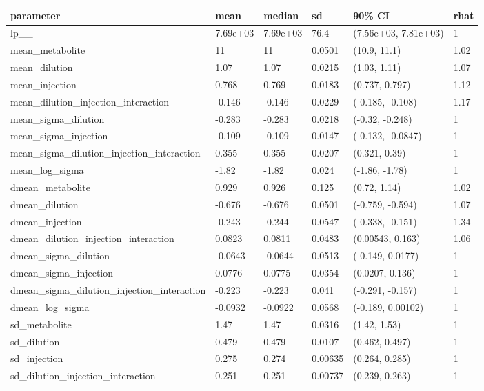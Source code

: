 
\begin{tabular}{l|l|l|l|l|l}
\hline
parameter & mean & median & sd & 90\% CI & rhat\\
\hline
lp\_\_ & 7.69e+03 & 7.69e+03 & 76.4 & (7.56e+03, 7.81e+03) & 1\\
\hline
mean\_metabolite & 11 & 11 & 0.0501 & (10.9, 11.1) & 1.02\\
\hline
mean\_dilution & 1.07 & 1.07 & 0.0215 & (1.03, 1.11) & 1.07\\
\hline
mean\_injection & 0.768 & 0.769 & 0.0183 & (0.737, 0.797) & 1.12\\
\hline
mean\_dilution\_injection\_interaction & -0.146 & -0.146 & 0.0229 & (-0.185, -0.108) & 1.17\\
\hline
mean\_sigma\_dilution & -0.283 & -0.283 & 0.0218 & (-0.32, -0.248) & 1\\
\hline
mean\_sigma\_injection & -0.109 & -0.109 & 0.0147 & (-0.132, -0.0847) & 1\\
\hline
mean\_sigma\_dilution\_injection\_interaction & 0.355 & 0.355 & 0.0207 & (0.321, 0.39) & 1\\
\hline
mean\_log\_sigma & -1.82 & -1.82 & 0.024 & (-1.86, -1.78) & 1\\
\hline
dmean\_metabolite & 0.929 & 0.926 & 0.125 & (0.72, 1.14) & 1.02\\
\hline
dmean\_dilution & -0.676 & -0.676 & 0.0501 & (-0.759, -0.594) & 1.07\\
\hline
dmean\_injection & -0.243 & -0.244 & 0.0547 & (-0.338, -0.151) & 1.34\\
\hline
dmean\_dilution\_injection\_interaction & 0.0823 & 0.0811 & 0.0483 & (0.00543, 0.163) & 1.06\\
\hline
dmean\_sigma\_dilution & -0.0643 & -0.0644 & 0.0513 & (-0.149, 0.0177) & 1\\
\hline
dmean\_sigma\_injection & 0.0776 & 0.0775 & 0.0354 & (0.0207, 0.136) & 1\\
\hline
dmean\_sigma\_dilution\_injection\_interaction & -0.223 & -0.223 & 0.041 & (-0.291, -0.157) & 1\\
\hline
dmean\_log\_sigma & -0.0932 & -0.0922 & 0.0568 & (-0.189, 0.00102) & 1\\
\hline
sd\_metabolite & 1.47 & 1.47 & 0.0316 & (1.42, 1.53) & 1\\
\hline
sd\_dilution & 0.479 & 0.479 & 0.0107 & (0.462, 0.497) & 1\\
\hline
sd\_injection & 0.275 & 0.274 & 0.00635 & (0.264, 0.285) & 1\\
\hline
sd\_dilution\_injection\_interaction & 0.251 & 0.251 & 0.00737 & (0.239, 0.263) & 1\\

\end{tabular}
